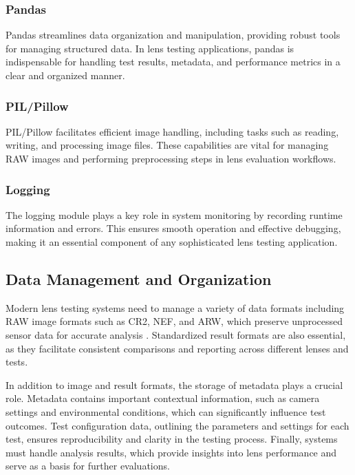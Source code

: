 \subsubsection{Pandas}  
Pandas streamlines data organization and manipulation, providing robust tools for managing structured data. In lens testing applications, pandas is indispensable for handling test results, metadata, and performance metrics in a clear and organized manner.

\subsubsection{PIL/Pillow}  
PIL/Pillow facilitates efficient image handling, including tasks such as reading, writing, and processing image files. These capabilities are vital for managing RAW images and performing preprocessing steps in lens evaluation workflows.

\subsubsection{Logging}  
The logging module plays a key role in system monitoring by recording runtime information and errors. This ensures smooth operation and effective debugging, making it an essential component of any sophisticated lens testing application.

\subsection{Data Management and Organization}

Modern lens testing systems need to manage a variety of data formats including RAW image formats such as CR2, NEF, and ARW, which preserve unprocessed sensor data for accurate analysis \cite{formats}. Standardized result formats are also essential, as they facilitate consistent comparisons and reporting across different lenses and tests.

In addition to image and result formats, the storage of metadata plays a crucial role. Metadata contains important contextual information, such as camera settings and environmental conditions, which can significantly influence test outcomes. Test configuration data, outlining the parameters and settings for each test, ensures reproducibility and clarity in the testing process. Finally, systems must handle analysis results, which provide insights into lens performance and serve as a basis for further evaluations.

